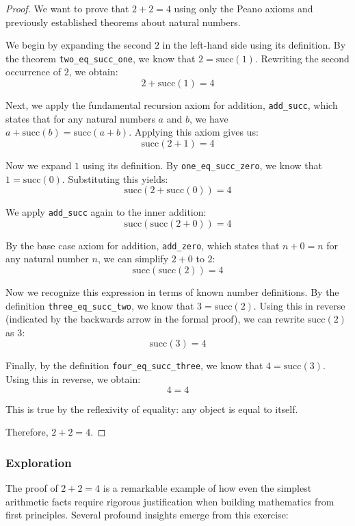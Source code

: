\documentclass{article}
\theoremstyle{theorem}
\theoremstyle{definition}
\theoremstyle{remark}
\begin{document}
\begin{proof}
We want to prove that $2 + 2 = 4$ using only the Peano axioms and previously established theorems about natural numbers.

We begin by expanding the second $2$ in the left-hand side using its definition. By the theorem \texttt{two\_eq\_succ\_one}, we know that $2 = \text{succ}(1)$. Rewriting the second occurrence of $2$, we obtain:
$$2 + \text{succ}(1) = 4$$

Next, we apply the fundamental recursion axiom for addition, \texttt{add\_succ}, which states that for any natural numbers $a$ and $b$, we have $a + \text{succ}(b) = \text{succ}(a + b)$. Applying this axiom gives us:
$$\text{succ}(2 + 1) = 4$$

Now we expand $1$ using its definition. By \texttt{one\_eq\_succ\_zero}, we know that $1 = \text{succ}(0)$. Substituting this yields:
$$\text{succ}(2 + \text{succ}(0)) = 4$$

We apply \texttt{add\_succ} again to the inner addition:
$$\text{succ}(\text{succ}(2 + 0)) = 4$$

By the base case axiom for addition, \texttt{add\_zero}, which states that $n + 0 = n$ for any natural number $n$, we can simplify $2 + 0$ to $2$:
$$\text{succ}(\text{succ}(2)) = 4$$

Now we recognize this expression in terms of known number definitions. By the definition \texttt{three\_eq\_succ\_two}, we know that $3 = \text{succ}(2)$. Using this in reverse (indicated by the backwards arrow in the formal proof), we can rewrite $\text{succ}(2)$ as $3$:
$$\text{succ}(3) = 4$$

Finally, by the definition \texttt{four\_eq\_succ\_three}, we know that $4 = \text{succ}(3)$. Using this in reverse, we obtain:
$$4 = 4$$

This is true by the reflexivity of equality: any object is equal to itself.

Therefore, $2 + 2 = 4$.
\end{proof}

\subsubsection{Exploration}

The proof of $2 + 2 = 4$ is a remarkable example of how even the simplest arithmetic facts require rigorous justification when building mathematics from first principles. Several profound insights emerge from this exercise:
\end{document}
